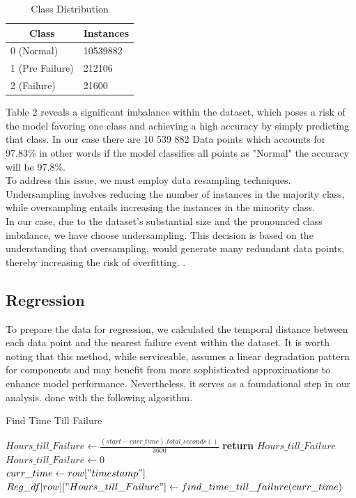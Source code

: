 \documentclass{article}
\begin{document}
\begin{table}[htbp]
\centering
\caption{Class Distribution}
\begin{tabular}{|l|l|}
\hline
\multicolumn{1}{|c|}{\textbf{Class}} & \multicolumn{1}{c|}{\textbf{Instances}} \\ \hline
0 (Normal)                           & 10539882                                \\ \hline
1 (Pre Failure)                      & 212106                                  \\ \hline
2 (Failure)                          & 21600                                   \\ \hline
\end{tabular}
\end{table}

Table 2 reveals a significant imbalance within the dataset, which poses a risk of the model favoring one class and achieving a high accuracy by simply predicting that class. In our case there are 10 539 882 Data points which accounts for 97.83\% in other words if the model classifies all points as "Normal" the accuracy will be 97.8\%. \\

To address this issue, we must employ data resampling techniques. Undersampling involves reducing the number of instances in the majority class, while oversampling entails increasing the instances in the minority class. \\

In our case, due to the dataset's substantial size and the pronounced class imbalance, we have choose undersampling. This decision is based on the understanding that oversampling, would generate many redundant data points, thereby increasing the risk of overfitting. \cite{ELLIS2023}.

\subsection{Regression} 
    
To prepare the data for regression, we calculated the temporal distance between each data point and the nearest failure event within the dataset. It is worth noting that this method, while serviceable, assumes a linear degradation pattern for components and may benefit from more sophisticated approximations to enhance model performance. Nevertheless, it serves as a foundational step in our analysis. done with the following algorithm.

\begin{algorithm}
\caption{Find Time Till Failure}
\begin{algorithmic}
        \State $Hours\_till\_Failure \gets \frac{(start - curr\_time).total\_seconds()}{3600}$
        \State \textbf{return} $Hours\_till\_Failure$
    \EndIf
\EndFor
\State $Hours\_till\_Failure \gets 0$ \\
    \State $curr\_time \gets row["timestamp"]$
    \State $Reg\_df[row]["Hours\_till\_Failure"] \gets find\_time\_till\_failure(curr\_time)$
\EndFor
\end{algorithmic}
\end{algorithm}
\end{document}
